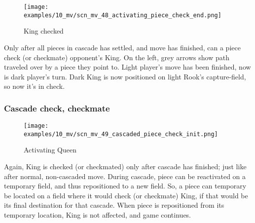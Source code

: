\noindent
\begin{wrapfigure}[11]{l}{0.4\textwidth}
\centering
\texttt{[image: examples/10\_mv/scn\_mv\_48\_activating\_piece\_check\_end.png]}
\vspace*{-1.4\baselineskip}
\caption{King checked}
\label{fig:scn_mv_48_activating_piece_check_end}
\end{wrapfigure}
Only after all pieces in cascade has settled, and move has finished, can a piece
check (or checkmate) opponent's King. \newline
\indent
On the left, grey arrows show path traveled over by a piece they point to.
Light player's move has been finished, now is dark player's turn. Dark King
is now positioned on light Rook's capture-field, so now it's in check.

\clearpage %

\subsubsection*{Cascade check, checkmate}
\label{sec:Miranda's veil/Wave/Cascading Waves/Cascade check, checkmate}

\vspace*{-1.4\baselineskip}
\noindent
\begin{figure}[!h]
\texttt{[image: examples/10\_mv/scn\_mv\_49\_cascaded\_piece\_check\_init.png]}
\caption{Activating Queen}
\label{fig:scn_mv_49_cascaded_piece_check_init}
\end{figure}

Again, King is checked (or checkmated) only after cascade has finished; just like
after normal, non-cascaded move. During cascade, piece can be reactivated on a
temporary field, and thus repositioned to a new field. So, a piece can temporary
be located on a field where it would check (or checkmate) King, if that would be
its final destination for that cascade. When piece is repositioned from its
temporary location, King is not affected, and game continues.

\clearpage %

